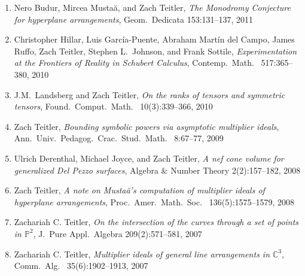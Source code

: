\documentclass[12pt]{article}
\begin{document}
\begin{enumerate}
\item
Nero Budur, Mircea Musta\u{a}, and Zach Teitler,
\emph{The Monodromy Conjecture for hyperplane arrangements},
Geom.\ Dedicata
153:131--137, 2011

\item
Christopher Hillar, Luis Garc\'ia-Puente, Abraham Mart\'in del Campo, James Ruffo, Zach Teitler,
Stephen L.\ Johnson, and Frank Sottile,
\emph{Experimentation at the Frontiers of Reality in Schubert Calculus},
Contemp.\ Math.\
517:365--380, 2010

\item J.M.~Landsberg and Zach Teitler,
\emph{On the ranks of tensors and symmetric tensors},
Found.\ Comput.\ Math.\
10(3):339--366, 2010

\item Zach Teitler,
\emph{Bounding symbolic powers via asymptotic multiplier ideals},
Ann.\ Univ.\ Pedagog.\ Crac.\ Stud.\ Math.\
8:67--77, 2009

\item Ulrich Derenthal, Michael Joyce, and Zach Teitler,
\emph{A nef cone volume for generalized Del Pezzo surfaces},
Algebra \& Number Theory
2(2):157--182, 2008

\item Zach Teitler,
\emph{A note on Musta\u{a}'s computation of multiplier ideals of hyperplane arrangements},
Proc.\ Amer.\ Math.\ Soc.\
136(5):1575--1579, 2008

\item Zachariah C. Teitler,
\emph{On the intersection of the curves through a set of points in $\mathbb{P}^2$},
J.\ Pure Appl.\ Algebra
209(2):571--581, 2007

\item Zachariah C. Teitler,
\emph{Multiplier ideals of general line arrangements in $\mathbb{C}^3$},
Comm.\ Alg.\
35(6):1902--1913, 2007

\end{enumerate}


%
%
\end{document}
